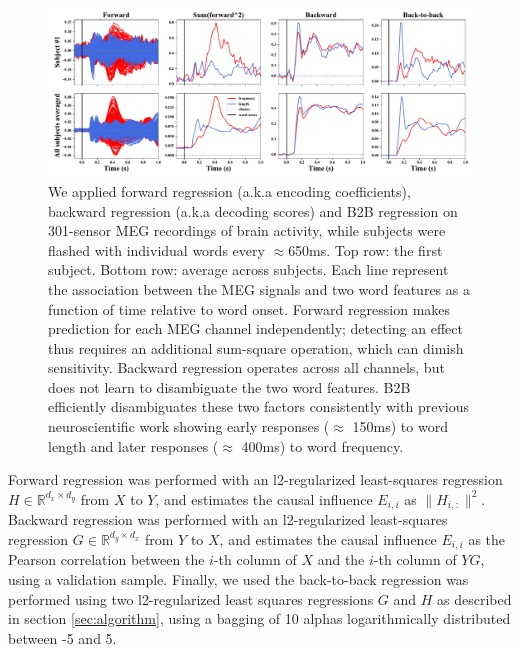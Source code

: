 \begin{figure}[t!]
  \centering
  \includegraphics[width=\textwidth, trim=0cm 0cm 0cm 0cm, clip=True]{figures/meg_twocurves.pdf}
  \caption{We applied forward regression (a.k.a encoding coefficients), backward regression (a.k.a decoding scores) and B2B regression on 301-sensor MEG recordings of brain activity, while subjects were flashed with individual words every $\approx$650ms. Top row: the first subject. Bottom row: average across subjects. Each line represent the association between the MEG signals and two word features as a function of time relative to word onset. Forward regression makes prediction for each MEG channel independently; detecting an effect thus requires an additional sum-square operation, which can dimish sensitivity. Backward regression operates across all channels, but does not learn to disambiguate the two word features. B2B efficiently disambiguates these two factors consistently with previous neuroscientific work \cite{kutas2011thirty}\citep{pegado2014timing}
  showing early responses ($\approx$ 150ms) to word length and later responses
  ($\approx$ 400ms) to word frequency.}
  \label{fig:meg_twocurves}
\end{figure}

Forward regression was performed with an l2-regularized least-squares regression $H \in \mathbb{R}^{d_x \times d_y}$ from $X$ to $Y$, and estimates the causal influence $E_{i,i}$ as $\| H_{i, :} \|^2$.
%
Backward regression was performed with an l2-regularized least-squares regression $G \in \mathbb{R}^{d_y \times d_x}$ from $Y$ to $X$, and estimates the causal influence $E_{i, i}$ as the Pearson correlation between the $i$-th column of $X$ and the $i$-th column of $YG$, using a validation sample.
%
Finally, we used the back-to-back regression was performed using two l2-regularized
least squares regressions $G$ and $H$ as described in section \ref{sec:algorithm}, using a bagging of 10 alphas logarithmically distributed between -5 and 5.

